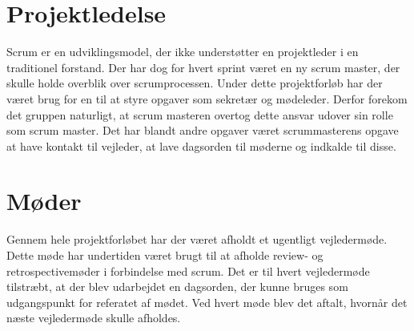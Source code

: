 
\section{Projektledelse}
Scrum er en udviklingsmodel, der ikke understøtter en projektleder i en traditionel forstand. Der har dog for hvert sprint været en ny scrum master, der skulle holde overblik over scrumprocessen. Under dette projektforløb har der været brug for en til at styre opgaver som sekretær og mødeleder. Derfor forekom det gruppen naturligt, at scrum masteren overtog dette ansvar udover sin rolle som scrum master. Det har blandt andre opgaver været scrummasterens opgave at have kontakt til vejleder, at lave dagsorden til møderne og indkalde til disse.  

\section{Møder}
Gennem hele projektforløbet har der været afholdt et ugentligt vejledermøde. Dette møde har undertiden været brugt til at afholde review- og retrospectivemøder i forbindelse med scrum. Det er til hvert vejledermøde tilstræbt, at der blev udarbejdet en dagsorden, der kunne bruges som udgangspunkt for referatet af mødet. Ved hvert møde blev det aftalt, hvornår det næste vejledermøde skulle afholdes. 


